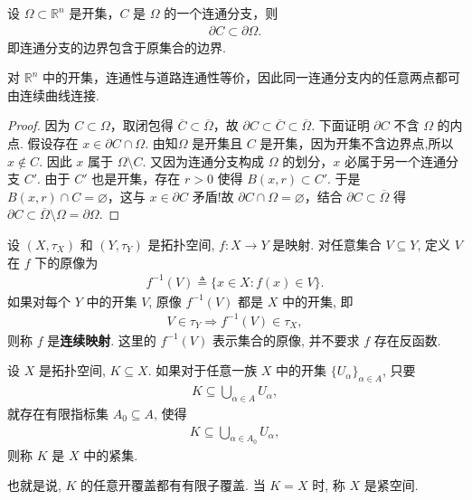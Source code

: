 \documentclass[../../main.tex]{subfiles}%
\begin{document}
\begin{proposition}\label{proposition:Rn中连通分支的边界包含于原集合的边界}
设 $\Omega\subset \mathbb{R}^n$ 是开集，$C$ 是 $\Omega$ 的一个连通分支，则
\begin{align*}
\partial C \subset \partial \Omega .
\end{align*}
即连通分支的边界包含于原集合的边界.
\end{proposition}
\begin{remark}
对 $\mathbb{R}^n$ 中的开集，连通性与道路连通性等价，因此同一连通分支内的任意两点都可由连续曲线连接.
\end{remark}
\begin{proof}
因为 $C\subset \Omega$，取闭包得 $\overline{C}\subset \overline{\Omega}$，故 $\partial C\subset \overline{C}\subset \overline{\Omega}$. 下面证明 $\partial C$ 不含 $\Omega$ 的内点.
假设存在 $x\in \partial C\cap \Omega$. 由知$\Omega$ 是开集且 $C$ 是开集，因为开集不含边界点,所以$x\notin C$. 因此 $x$ 属于 $\Omega\setminus C$. 又因为连通分支构成 $\Omega$ 的划分，$x$ 必属于另一个连通分支 $C'$. 由于 $C'$ 也是开集，存在 $r>0$ 使得 $B(x,r)\subset C'$. 于是 $B(x,r)\cap C=\varnothing$，这与 $x\in \partial C$ 矛盾!故 $\partial C\cap \Omega=\varnothing$，结合 $\partial C\subset \overline{\Omega}$ 得 $\partial C\subset \overline{\Omega}\setminus \Omega=\partial \Omega$.
\end{proof}




\begin{definition}[连续映射]\label{definition:topology-连续映射-Q7m2R9}
设 $(X,\tau_X)$ 和 $(Y,\tau_Y)$ 是拓扑空间, $f:X\to Y$ 是映射. 对任意集合 $V\subseteq Y$, 定义 $V$ 在 $f$ 下的原像为
\begin{align*}
f^{-1}(V)\triangleq\{x\in X:f(x)\in V\}.
\end{align*}
如果对每个 $Y$ 中的开集 $V$, 原像 $f^{-1}(V)$ 都是 $X$ 中的开集, 即
\begin{align*}
V\in\tau_Y\Longrightarrow f^{-1}(V)\in\tau_X,
\end{align*}
则称 $f$ 是\textbf{连续映射}.
这里的 $f^{-1}(V)$ 表示集合的原像, 并不要求 $f$ 存在反函数.
\end{definition}

\label{topology-theorem:连续映射的基本性质}

\begin{definition}[紧集]\label{definition:topology-紧集-L4p8N2}
设 $X$ 是拓扑空间, $K\subseteq X$. 如果对于任意一族 $X$ 中的开集 $\{U_\alpha\}_{\alpha\in A}$, 只要
\begin{align*}
K\subseteq\bigcup\limits_{\alpha\in A}U_\alpha,
\end{align*}
就存在有限指标集 $A_0\subseteq A$, 使得
\begin{align*}
K\subseteq\bigcup\limits_{\alpha\in A_0}U_\alpha,
\end{align*}
则称 $K$ 是 $X$ 中的紧集.

也就是说, $K$ 的任意开覆盖都有有限子覆盖. 当 $K=X$ 时, 称 $X$ 是紧空间.
\end{definition}
\end{document}
